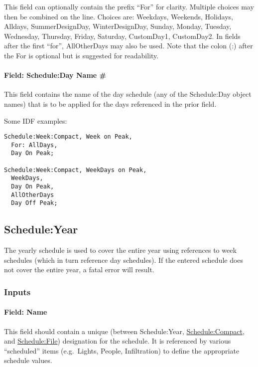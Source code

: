 This field can optionally contain the prefix ``For'' for clarity. Multiple choices may then be combined on the line. Choices are: Weekdays, Weekends, Holidays, Alldays, SummerDesignDay, WinterDesignDay, Sunday, Monday, Tuesday, Wednesday, Thursday, Friday, Saturday, CustomDay1, CustomDay2. In fields after the first ``for'', AllOtherDays may also be used. Note that the colon (:) after the For is optional but is suggested for readability.

\paragraph{Field: Schedule:Day Name \#}\label{field-scheduleday-name}

This field contains the name of the day schedule (any of the Schedule:Day object names) that is to be applied for the days referenced in the prior field.

Some IDF examples:

\begin{lstlisting}
Schedule:Week:Compact, Week on Peak,
  For: AllDays,
  Day On Peak;

Schedule:Week:Compact, WeekDays on Peak,
  WeekDays,
  Day On Peak,
  AllOtherDays
  Day Off Peak;
\end{lstlisting}

\subsection{Schedule:Year}\label{scheduleyear}

The yearly schedule is used to cover the entire year using references to week schedules (which in turn reference day schedules). If the entered schedule does not cover the entire year, a fatal error will result.

\subsubsection{Inputs}\label{inputs-6-023}

\paragraph{Field: Name}\label{field-name-5-021}

This field should contain a unique (between Schedule:Year, \hyperref[schedulecompact]{Schedule:Compact}, and \hyperref[schedulefile]{Schedule:File}) designation for the schedule. It is referenced by various ``scheduled'' items (e.g.~Lights, People, Infiltration) to define the appropriate schedule values.

